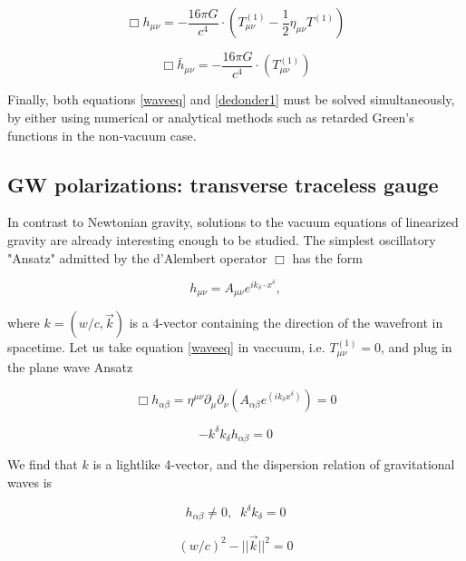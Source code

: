 \begin{equation}\label{dedonder1}
\Box h_{\mu\nu} = -\frac{16\pi G}{c^4} \cdot (T^{(1)}_{\mu\nu} - \frac{1}{2} \eta_{\mu\nu} T^{(1)})
\end{equation}

\begin{equation}\label{dedonder2}
\Box \bar{h}_{\mu\nu} = -\frac{16\pi G}{c^4} \cdot (T^{(1)}_{\mu\nu})
\end{equation}
 

Finally, both equations \ref{waveeq} and \ref{dedonder1} must be solved simultaneously, by either using numerical or analytical methods such as retarded Green's functions in the non-vacuum case. 


\subsection{GW polarizations: transverse traceless gauge}

In contrast to Newtonian gravity, solutions to the vacuum equations of linearized gravity are already interesting enough to be studied. The simplest oscillatory "Ansatz" admitted by the  d'Alembert operator $\Box$ has the form   

\begin{equation}\label{planew}
h_{\mu\nu} = A_{\mu\nu} e^{i k_{\delta} \cdot x^{\delta}},
\end{equation}

where $k = (w/c, \vec{k})$ is a 4-vector containing the direction of the wavefront in spacetime. Let us take equation \ref{waveeq} in vaccuum, i.e. $T^{(1)}_{\mu \nu} = 0$, and plug in the plane wave Ansatz

\begin{equation}
\Box h_{\alpha \beta} = \eta^{\mu \nu} \partial_{\mu} \partial_{\nu} \left( A_{\alpha \beta} e^{(i k_{\delta} x^{\delta})} \right) = 0 
\end{equation}

\begin{equation}
- k^\delta k_\delta h_{\alpha \beta} = 0 
\end{equation}

We find that $k$ is a lightlike 4-vector, and the dispersion relation of gravitational waves is 

\begin{equation}
h_{\alpha \beta} \neq 0, \;\; k^\delta k_\delta = 0
\end{equation}

\begin{equation}
(w/c)^2 - || \vec{k} ||^2 = 0
\end{equation}

